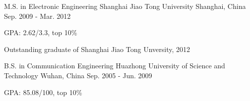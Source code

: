 

\begin{cventries}

  \cventry
    {M.S. in Electronic Engineering} %
    {Shanghai Jiao Tong University} %
    {Shanghai, China} %
    {Sep. 2009 - Mar. 2012} %
    {
      \begin{cvitems} %
        \item {GPA: 2.62/3.3, top 10\%}
        \item {Outstanding graduate of Shanghai Jiao Tong Unversity, 2012}
      \end{cvitems}
    }

  \cventry
    {B.S. in Communication Engineering} %
    {Huazhong University of Science and Technology} %
    {Wuhan, China} %
    {Sep. 2005 - Jun. 2009} %
    {
      \begin{cvitems} %
        \item {GPA: 85.08/100, top 10\%}
      \end{cvitems}
    }

\end{cventries}
